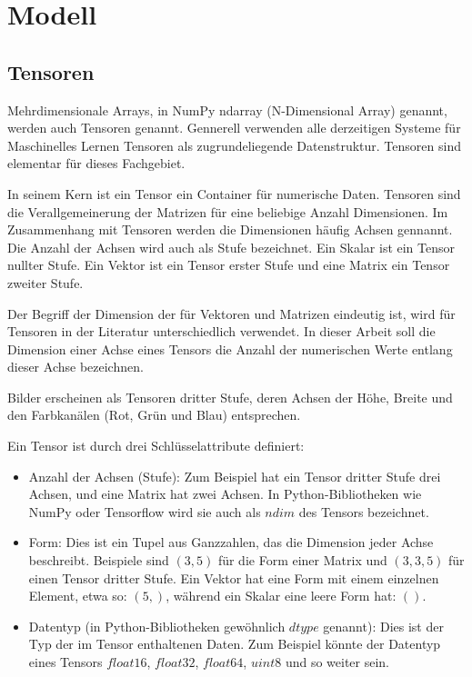 \chapter{Modell}
\label{ch:model}

\section{Tensoren}
Mehrdimensionale Arrays, in NumPy ndarray (N-Dimensional Array) genannt, werden auch Tensoren genannt. Gennerell verwenden alle derzeitigen Systeme für Maschinelles Lernen Tensoren als zugrundeliegende Datenstruktur. Tensoren sind elementar für dieses Fachgebiet. \cite{chollet2017}

In seinem Kern ist ein Tensor ein Container für numerische Daten. Tensoren sind die Verallgemeinerung der Matrizen für eine beliebige Anzahl Dimensionen. Im Zusammenhang mit Tensoren werden die Dimensionen häufig Achsen gennannt. Die Anzahl der Achsen wird auch als Stufe bezeichnet. Ein Skalar ist ein Tensor nullter Stufe. Ein Vektor ist ein Tensor erster Stufe und eine Matrix ein Tensor zweiter Stufe. \cite{chollet2017}

Der Begriff der Dimension der für Vektoren und Matrizen eindeutig ist, wird für Tensoren in der Literatur unterschiedlich verwendet.  \cite{chollet2017} In dieser Arbeit soll die Dimension einer Achse eines Tensors die Anzahl der numerischen Werte entlang dieser Achse bezeichnen.

Bilder erscheinen als Tensoren dritter Stufe, deren Achsen der Höhe, Breite und den Farbkanälen (Rot, Grün und Blau) entsprechen. \cite{zhang2020dive}

Ein Tensor ist durch drei Schlüsselattribute definiert:
\begin{itemize}
\item Anzahl der Achsen (Stufe): Zum Beispiel hat ein Tensor dritter Stufe drei Achsen, und eine Matrix hat zwei Achsen. In Python-Bibliotheken wie NumPy oder Tensorflow wird sie auch als $ndim$ des Tensors bezeichnet.
\item Form: Dies ist ein Tupel aus Ganzzahlen, das die Dimension jeder Achse beschreibt. Beispiele sind $(3, 5)$ für die Form einer Matrix und $(3, 3, 5)$ für einen Tensor dritter Stufe. Ein Vektor hat eine Form mit einem einzelnen Element, etwa so: $(5,)$, während ein Skalar eine leere Form hat: $()$.
\item Datentyp (in Python-Bibliotheken gewöhnlich $dtype$ genannt): Dies ist der Typ der im Tensor enthaltenen Daten. Zum Beispiel könnte der Datentyp eines Tensors $float16$, $float32$, $float64$, $uint8$ und so weiter sein.
\end{itemize}
\cite{chollet2017}

